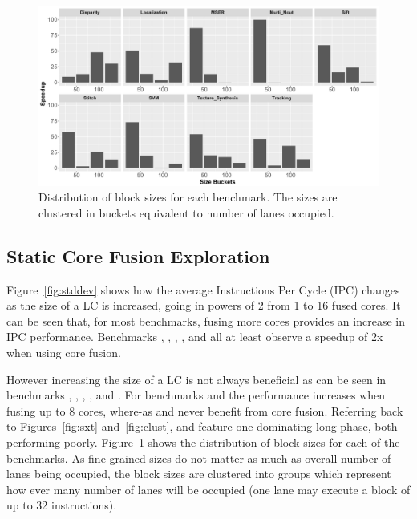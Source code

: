 \begin{figure}[t]
    \centering
    \includegraphics[width=1\textwidth]{cases-paper/graphics/Exploration/SizeBuckets.pdf}
    \caption{Distribution of block sizes for each benchmark. The sizes are clustered in buckets equivalent to number of lanes occupied.}
    \label{fig:block_sizes}
	\vspace{5mm}
\end{figure}
\subsection{Static Core Fusion Exploration}

Figure~\ref{fig:stddev} shows how the average Instructions Per Cycle (IPC) changes as the size of a LC is increased, going in powers of 2 from 1 to 16 fused cores.
It can be seen that, for most benchmarks, fusing more cores provides an increase in IPC performance.
Benchmarks , , , ,  and  all at least observe a speedup of 2x when using core fusion.

However increasing the size of a LC is not always beneficial as can be seen in benchmarks , , , , and .
For benchmarks  and  the performance increases when fusing up to 8 cores, where-as  and  never benefit from core fusion. 
Referring back to Figures~\ref{fig:sxt} and~\ref{fig:clust},  and  feature one dominating long phase, both performing poorly.
Figure~\ref{fig:block_sizes} shows the distribution of block-sizes for each of the benchmarks.
As fine-grained sizes do not matter as much as overall number of lanes being occupied, the block sizes are clustered into groups which represent how ever many number of lanes will be occupied (one lane may execute a block of up to 32 instructions).

